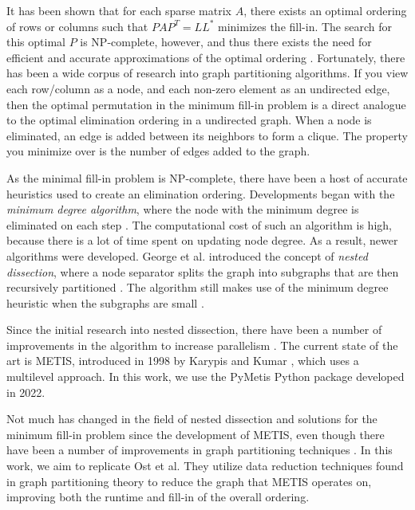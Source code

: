\documentclass[final]{siamart250211}
\begin{document}
It has been shown that for each sparse matrix $A$, there exists an optimal ordering of rows or columns such that $PAP^T = LL^\ast$ minimizes the fill-in. The search for this optimal $P$ is NP-complete, however, and thus there exists the need for efficient and accurate approximations of the optimal ordering \cite{Ya81}. Fortunately, there has been a wide corpus of research into graph partitioning algorithms. If you view each row/column as a node, and each non-zero element as an undirected edge, then the optimal permutation in the minimum fill-in problem is a direct analogue to the optimal elimination ordering in a undirected graph. When a node is eliminated, an edge is added between its neighbors to form a clique. The property you minimize over is the number of edges added to the graph. 

As the minimal fill-in problem is NP-complete, there have been a host of accurate heuristics used to create an elimination ordering. Developments began with the \textit{minimum degree algorithm}, where the node with the minimum degree is eliminated on each step \cite{TiWa67, As95}. The computational cost of such an algorithm is high, because there is a lot of time spent on updating node degree. As a result, newer algorithms were developed. George et al. introduced the concept of \textit{nested dissection}, where a node separator splits the graph into subgraphs that are then recursively partitioned \cite{Ge73, KhMiShXX}. The algorithm still makes use of the minimum degree heuristic when the subgraphs are small \cite{OsScSt20, GeLi89}.

Since the initial research into nested dissection, there have been a number of improvements in the algorithm to increase parallelism \cite{LaKa15, KaKu98}. The current state of the art is METIS, introduced in 1998 by Karypis and Kumar \cite{KaKu98}, which uses a multilevel approach. In this work, we use the PyMetis \cite{PyMetis2022} Python package developed in 2022. 

Not much has changed in the field of nested dissection and solutions for the minimum fill-in problem since the development of METIS, even though there have been a number of improvements in graph partitioning techniques \cite{OsScSt20}. In this work, we aim to replicate Ost et al. They utilize data reduction techniques found in graph partitioning theory to reduce the graph that METIS operates on, improving both the runtime and fill-in of the overall ordering. 


 
\end{document}
